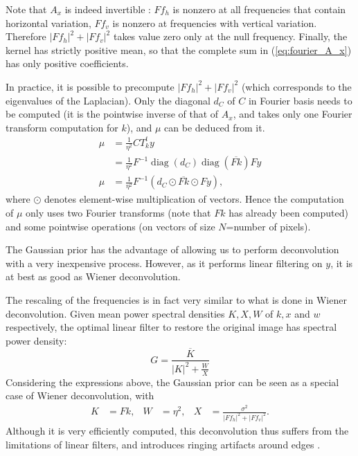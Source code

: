\documentclass[english,a4paper]{article}
\theoremstyle{plain}
\theoremstyle{definition}
\theoremstyle{remark}
\DeclareMathOperator{\diag}{diag}
\begin{document}
Note that $A_x$ is indeed invertible : $Ff_h$ is nonzero at all frequencies that contain horizontal variation, $Ff_v$ is nonzero at frequencies with vertical variation. Therefore $|Ff_h|^2 + |Ff_v|^2$ takes value zero only at the null frequency. Finally, the kernel has strictly positive mean, so that the complete sum in (\ref{eq:fourier_A_x}) has only positive coefficients.

In practice, it is possible to precompute $|Ff_h|^2+|Ff_v|^2$ (which corresponds to the eigenvalues of the Laplacian). Only the diagonal $d_C$ of $C$ in Fourier basis needs to be computed (it is the pointwise inverse of that of $A_x$, and takes only one Fourier transform computation for $k$), and $\mu$ can be deduced from it.
\begin{align}\label{eq:mu_fourier}
\mu &= \frac{1}{\eta^2} C T_k^t y \nonumber\\
&= \frac{1}{\eta^2} F^{-1} \diag(d_C) \diag(\overline{Fk}) Fy \nonumber\\
\mu &= \frac{1}{\eta^2} F^{-1} (d_C \odot \overline{Fk} \odot Fy),
\end{align}
where $\odot$ denotes element-wise multiplication of vectors.
Hence the computation of $\mu$ only uses two Fourier transforms (note that $Fk$ has already been computed) and some pointwise operations (on vectors of size $N$=number of pixels).

The Gaussian prior has the advantage of allowing us to perform deconvolution with a very inexpensive process.
However, as it performs linear filtering on $y$, it is at best as good as Wiener deconvolution.

The rescaling of the frequencies is in fact very similar to what is done in Wiener deconvolution. Given mean power spectral densities $K,X,W$ of $k,x$ and $w$ respectively, the optimal linear filter to restore the original image has spectral power density:
\begin{equation}\label{eq:wiener_deconv}
G = \frac{\overline{K}}{|K|^2 + \frac{W}{X}}
\end{equation}
Considering the expressions above, the Gaussian prior can be seen as a special case of Wiener deconvolution, with 
\begin{align*}
K &= Fk,& W &= \eta^2,& X &= \frac{\sigma^2}{|Ff_h|^2+|Ff_v|^2}.
\end{align*}
Although it is very efficiently computed, this deconvolution thus suffers from the limitations of linear filters, and introduces ringing artifacts around edges \cite{shan2008high}.
\end{document}
